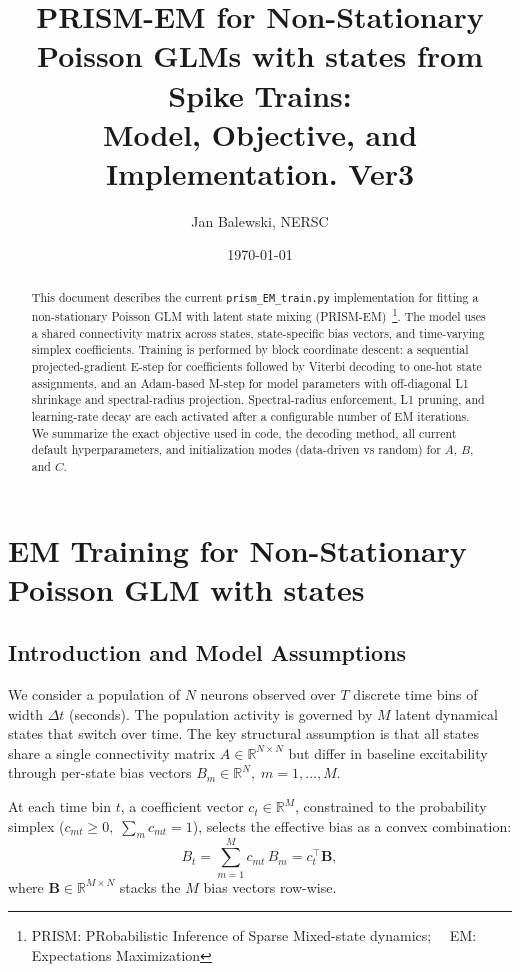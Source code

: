 \documentclass[11pt]{article}
\title{PRISM-EM for Non-Stationary Poisson GLMs with states from Spike Trains:\\
Model, Objective, and Implementation. Ver3}
\author{Jan Balewski, NERSC}
\date{\today}
\begin{document}
\maketitle

\begin{abstract}
This document describes the current \texttt{prism\_EM\_train.py} implementation for fitting a non-stationary Poisson GLM with latent state mixing (PRISM-EM)~\footnote{PRISM: PRobabilistic Inference of Sparse Mixed-state dynamics; ~~EM: Expectations Maximization}. The model uses a shared connectivity matrix across states, state-specific bias vectors, and time-varying simplex coefficients. Training is performed by block coordinate descent: a sequential projected-gradient E-step for coefficients followed by Viterbi decoding to one-hot state assignments, and an Adam-based M-step for model parameters with off-diagonal L1 shrinkage and spectral-radius projection. Spectral-radius enforcement, L1 pruning, and learning-rate decay are each activated after a configurable number of EM iterations. We summarize the exact objective used in code, the decoding method, all current default hyperparameters, and initialization modes (data-driven vs random) for \(A\), \(B\), and \(C\).
\end{abstract}

\tableofcontents
\newpage

\section{EM Training for Non-Stationary Poisson GLM with states}
\label{sec:em}

\subsection{Introduction and Model Assumptions}

We consider a population of \(N\) neurons observed over \(T\) discrete time
bins of width \(\Delta t\) (seconds). The population activity is governed
by \(M\) latent dynamical states that switch over time. The key
structural assumption is that all states share a single
connectivity matrix \(A \in \mathbb{R}^{N \times N}\) but differ in
baseline excitability through per-state bias vectors
\(B_m \in \mathbb{R}^N,\; m = 1, \dots, M\).

At each time bin \(t\), a coefficient vector
\(c_t \in \mathbb{R}^M\), constrained to the probability simplex
(\(c_{mt}\ge 0,\; \sum_m c_{mt}=1\)), selects the effective bias as a
convex combination:
\begin{equation}
  B_t = \sum_{m=1}^{M} c_{mt}\, B_m = c_t^\top \mathbf{B},
\end{equation}
where \(\mathbf{B} \in \mathbb{R}^{M \times N}\) stacks the \(M\) bias
vectors row-wise.
\end{document}
